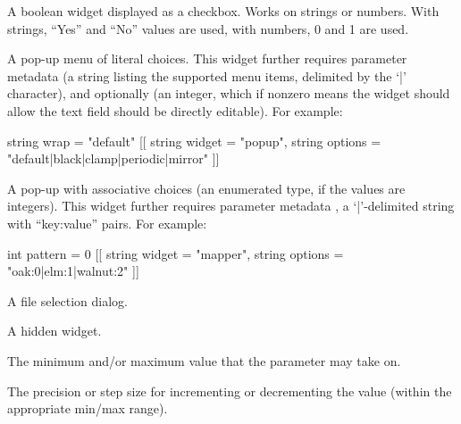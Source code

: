 \documentclass[11pt,letterpaper]{book}
\begin{document}
\vspace{12pt}
A boolean widget displayed as a checkbox. Works on strings or
numbers. With strings, ``Yes'' and ``No'' values are used, with numbers,
0 and 1 are used.
\apiend
\vspace{-12pt}

\vspace{12pt}
A pop-up menu of literal choices. This widget further requires
parameter metadata  (a string listing the supported
menu items, delimited by the `{\cf |}' character), and optionally 
(an integer, which if nonzero means the widget should allow the
text field should be directly editable).  For example:
\begin{code}
    string wrap = "default"
        [[ string widget = "popup",
           string options = "default|black|clamp|periodic|mirror" ]]
\end{code}
\apiend
\vspace{-16pt}

\vspace{12pt}
A pop-up with associative choices (an enumerated type, if the values
are integers).  This widget further requires
parameter metadata , a `{\cf |}'-delimited string with
``key:value'' pairs.  For example:
\begin{code}
    int pattern = 0
        [[ string widget = "mapper",
           string options = "oak:0|elm:1|walnut:2" ]]
\end{code}
\apiend
\vspace{-16pt}

\vspace{12pt}
A file selection dialog.
\apiend
\vspace{-16pt}

\vspace{12pt}
A hidden widget.
\apiend
\vspace{-16pt}

\apiend

The minimum and/or maximum value that the parameter may take on.
\apiend

The precision or step size for incrementing or decrementing the value
(within the appropriate min/max range).
\apiend
\end{document}
